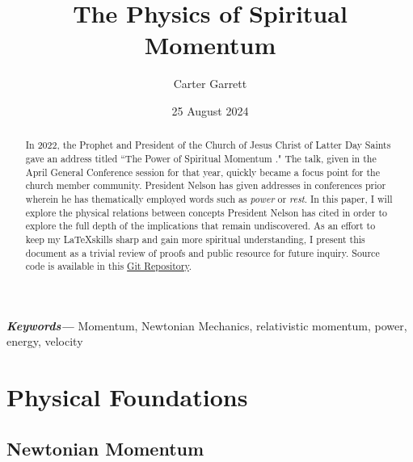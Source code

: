 \documentclass{article}
\title{The Physics of Spiritual Momentum}
\author{Carter Garrett}
\date{25 August 2024}
\providecommand{\keywords}[1]
{
  \small	
  \textbf{\textit{Keywords---}} #1
}
\begin{document}
    \maketitle

    \begin{abstract}
        In 2022, the Prophet and President of the Church of Jesus Christ of Latter Day Saints gave an address titled ``The Power of Spiritual Momentum \cite{Nelson}."
        The talk, given in the April General Conference session for that year, quickly became a focus point for the church member community. 
        President Nelson has given addresses in conferences prior wherein he has thematically employed words such as \textit{power} or \textit{rest}.
        In this paper, I will explore the physical relations between concepts President Nelson has cited in order to explore the full depth of the implications that remain undiscovered.
        As an effort to keep my \LaTeX \space skills sharp and gain more spiritual understanding, I present this document as a trivial review of proofs and public resource for future inquiry. 
        Source code is available in this \href{https://github.com/carter-mg/projects-assorted.git}{Git Repository}.
    \end{abstract}

    \keywords{Momentum, Newtonian Mechanics, relativistic momentum, power, energy, velocity}

\newpage

    \tableofcontents

\newpage

    \section{Physical Foundations}

        \subsection{Newtonian Momentum}
\end{document}
